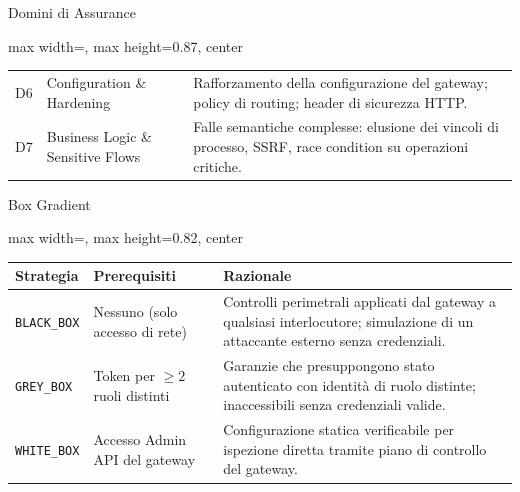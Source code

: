 \begin{frame}{Domini di Assurance}
\begin{adjustbox}{max width=\textwidth, max height=0.87\textheight, center}
\begin{tabularx}{\textwidth}{@{} c l >{\raggedright\arraybackslash}X @{}}
      D6               & Configuration \& Hardening        & Rafforzamento della configurazione del gateway; policy di routing; header di sicurezza HTTP.                            \\
      D7               & Business Logic \& Sensitive Flows & Falle semantiche complesse: elusione dei vincoli di processo, SSRF, race condition su operazioni critiche.              \\
      \bottomrule
    \end{tabularx}
  \end{adjustbox}
\end{frame}

\begin{frame}{Box Gradient}
  \footnotesize
  \begin{adjustbox}{max width=\textwidth, max height=0.82\textheight, center}
    \begin{tabularx}{\textwidth}{@{} l l >{\raggedright\arraybackslash}X @{}}
      \toprule
      \textbf{Strategia}  & \textbf{Prerequisiti}             & \textbf{Razionale}                                                                                                             \\
      \midrule
      \texttt{BLACK\_BOX} & Nessuno (solo accesso di rete)    & Controlli perimetrali applicati dal gateway a qualsiasi interlocutore; simulazione di un attaccante esterno senza credenziali. \\
      \addlinespace
      \texttt{GREY\_BOX}  & Token per $\geq 2$ ruoli distinti & Garanzie che presuppongono stato autenticato con identità di ruolo distinte; inaccessibili senza credenziali valide.           \\
      \addlinespace
      \texttt{WHITE\_BOX} & Accesso Admin API del gateway     & Configurazione statica verificabile per ispezione diretta tramite piano di controllo del gateway.                              \\
      \bottomrule
    \end{tabularx}
  \end{adjustbox}
\end{frame}

